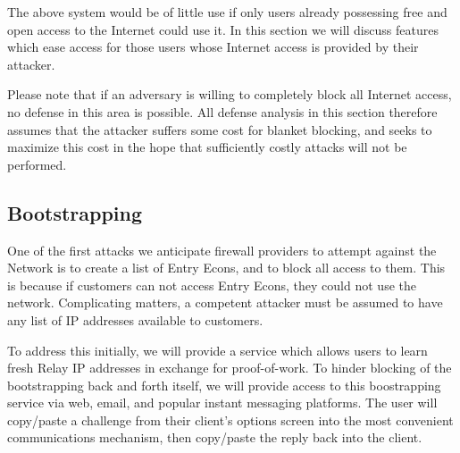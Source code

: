
The above system would be of little use if only users already
possessing free and open access to the Internet could use it. In this
section we will discuss features which ease access for those users
whose Internet access is provided by their attacker.

Please note that if an adversary is willing to completely block all
Internet access, no defense in this area is possible. All defense
analysis in this section therefore assumes that the attacker suffers
some cost for blanket blocking, and seeks to maximize this cost in the
hope that sufficiently costly attacks will not be performed.

\subsection{Bootstrapping}

One of the first attacks we anticipate firewall providers to attempt
against the \Orchid{} Network is to create a list of Entry Econs, and to
block all access to them. This is because if customers can not access
Entry Econs, they could not use the network. Complicating matters, a
competent attacker must be assumed to have any list of IP addresses
available to customers.


To address this initially, we will provide a service which allows
users to learn fresh Relay IP addresses in exchange for proof-of-work.
To hinder blocking of the bootstrapping back and forth itself, we will
provide access to this boostrapping service via web, email, and
popular instant messaging platforms. The user will copy/paste a
challenge from their client's options screen into the most convenient
communications mechanism, then copy/paste the reply back into the
client.

